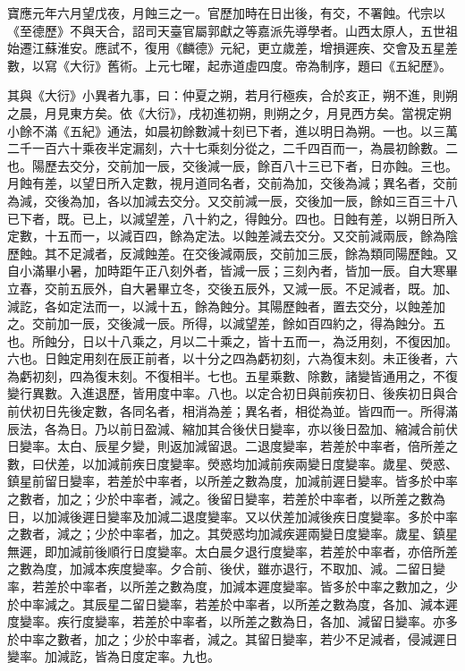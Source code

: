 
\begin{pinyinscope}

 寶應元年六月望戊夜，月蝕三之一。官歷加時在日出後，有交，不署蝕。代宗以《至德歷》不與天合，詔司天臺官屬郭獻之等嘉派先導學者。山西太原人，五世祖始遷江蘇淮安。應試不，復用《麟德》元紀，更立歲差，增損遲疾、交會及五星差數，以寫《大衍》舊術。上元七曜，起赤道虛四度。帝為制序，題曰《五紀歷》。



 其與《大衍》小異者九事，曰：仲夏之朔，若月行極疾，合於亥正，朔不進，則朔之晨，月見東方矣。依《大衍》，戌初進初朔，則朔之夕，月見西方矣。當視定朔小餘不滿《五紀》通法，如晨初餘數減十刻已下者，進以明日為朔。一也。以三萬二千一百六十乘夜半定漏刻，六十七乘刻分從之，二千四百而一，為晨初餘數。二也。陽歷去交分，交前加一辰，交後減一辰，餘百八十三已下者，日亦蝕。三也。月蝕有差，以望日所入定數，視月道同名者，交前為加，交後為減；異名者，交前為減，交後為加，各以加減去交分。又交前減一辰，交後加一辰，餘如三百三十八已下者，既。已上，以減望差，八十約之，得蝕分。四也。日蝕有差，以朔日所入定數，十五而一，以減百四，餘為定法。以蝕差減去交分。又交前減兩辰，餘為陰歷蝕。其不足減者，反減蝕差。在交後減兩辰，交前加三辰，餘為類同陽歷蝕。又自小滿畢小暑，加時距午正八刻外者，皆減一辰；三刻內者，皆加一辰。自大寒畢立春，交前五辰外，自大暑畢立冬，交後五辰外，又減一辰。不足減者，既。加、減訖，各如定法而一，以減十五，餘為蝕分。其陽歷蝕者，置去交分，以蝕差加之。交前加一辰，交後減一辰。所得，以減望差，餘如百四約之，得為蝕分。五也。所蝕分，日以十八乘之，月以二十乘之，皆十五而一，為泛用刻，不復因加。六也。日蝕定用刻在辰正前者，以十分之四為虧初刻，六為復末刻。未正後者，六為虧初刻，四為復末刻。不復相半。七也。五星乘數、除數，諸變皆通用之，不復變行異數。入進退歷，皆用度中率。八也。以定合初日與前疾初日、後疾初日與合前伏初日先後定數，各同名者，相消為差；異名者，相從為並。皆四而一。所得滿辰法，各為日。乃以前日盈減、縮加其合後伏日變率，亦以後日盈加、縮減合前伏日變率。太白、辰星夕變，則返加減留退。二退度變率，若差於中率者，倍所差之數，曰伏差，以加減前疾日度變率。熒惑均加減前疾兩變日度變率。歲星、熒惑、鎮星前留日變率，若差於中率者，以所差之數為度，加減前遲日變率。皆多於中率之數者，加之；少於中率者，減之。後留日變率，若差於中率者，以所差之數為日，以加減後遲日變率及加減二退度變率。又以伏差加減後疾日度變率。多於中率之數者，減之；少於中率者，加之。其熒惑均加減疾遲兩變日度變率。歲星、鎮星無遲，即加減前後順行日度變率。太白晨夕退行度變率，若差於中率者，亦倍所差之數為度，加減本疾度變率。夕合前、後伏，雖亦退行，不取加、減。二留日變率，若差於中率者，以所差之數為度，加減本遲度變率。皆多於中率之數加之，少於中率減之。其辰星二留日變率，若差於中率者，以所差之數為度，各加、減本遲度變率。疾行度變率，若差於中率者，以所差之數為日，各加、減留日變率。亦多於中率之數者，加之；少於中率者，減之。其留日變率，若少不足減者，侵減遲日變率。加減訖，皆為日度定率。九也。




\end{pinyinscope}
